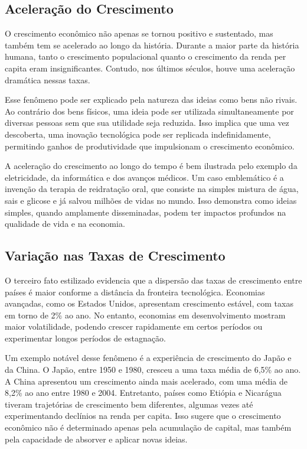 \documentclass[a4paper,12pt]{article}[abntex2]
\begin{document}
\subsection{Aceleração do Crescimento}
O crescimento econômico não apenas se tornou positivo e sustentado, mas também tem se acelerado ao longo da história. Durante a maior parte da história humana, tanto o crescimento populacional quanto o crescimento da renda per capita eram insignificantes. Contudo, nos últimos séculos, houve uma aceleração dramática nessas taxas.

Esse fenômeno pode ser explicado pela natureza das ideias como bens não rivais. Ao contrário dos bens físicos, uma ideia pode ser utilizada simultaneamente por diversas pessoas sem que sua utilidade seja reduzida. Isso implica que uma vez descoberta, uma inovação tecnológica pode ser replicada indefinidamente, permitindo ganhos de produtividade que impulsionam o crescimento econômico. 

A aceleração do crescimento ao longo do tempo é bem ilustrada pelo exemplo da eletricidade, da informática e dos avanços médicos. Um caso emblemático é a invenção da terapia de reidratação oral, que consiste na simples mistura de água, sais e glicose e já salvou milhões de vidas no mundo. Isso demonstra como ideias simples, quando amplamente disseminadas, podem ter impactos profundos na qualidade de vida e na economia.

\subsection{Variação nas Taxas de Crescimento}
O terceiro fato estilizado evidencia que a dispersão das taxas de crescimento entre países é maior conforme a distância da fronteira tecnológica. Economias avançadas, como os Estados Unidos, apresentam crescimento estável, com taxas em torno de 2\% ao ano. No entanto, economias em desenvolvimento mostram maior volatilidade, podendo crescer rapidamente em certos períodos ou experimentar longos períodos de estagnação.

Um exemplo notável desse fenômeno é a experiência de crescimento do Japão e da China. O Japão, entre 1950 e 1980, cresceu a uma taxa média de 6,5\% ao ano. A China apresentou um crescimento ainda mais acelerado, com uma média de 8,2\% ao ano entre 1980 e 2004. Entretanto, países como Etiópia e Nicarágua tiveram trajetórias de crescimento bem diferentes, algumas vezes até experimentando declínios na renda per capita. Isso sugere que o crescimento econômico não é determinado apenas pela acumulação de capital, mas também pela capacidade de absorver e aplicar novas ideias.
\end{document}
